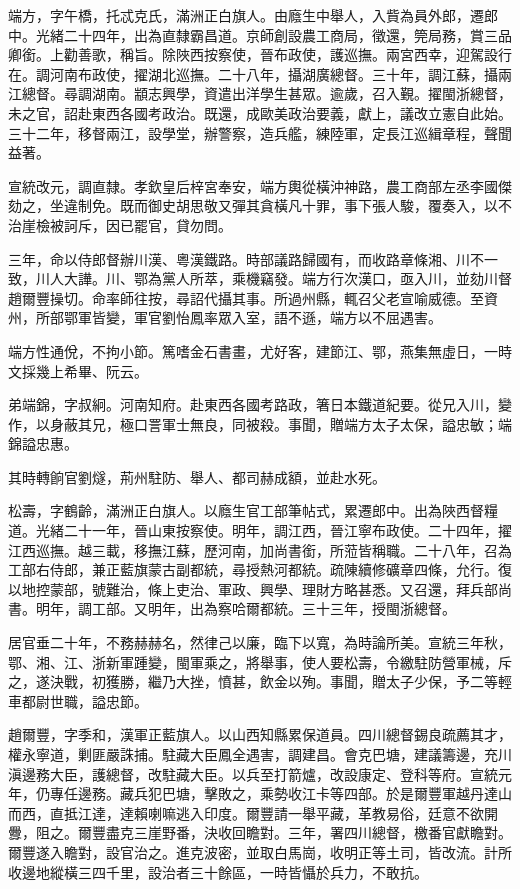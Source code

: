 \begin{pinyinscope}
端方，字午橋，托忒克氏，滿洲正白旗人。由廕生中舉人，入貲為員外郎，遷郎中。光緒二十四年，出為直隸霸昌道。京師創設農工商局，徵還，筦局務，賞三品卿銜。上勸善歌，稱旨。除陜西按察使，晉布政使，護巡撫。兩宮西幸，迎駕設行在。調河南布政使，擢湖北巡撫。二十八年，攝湖廣總督。三十年，調江蘇，攝兩江總督。尋調湖南。顓志興學，資遣出洋學生甚眾。逾歲，召入覲。擢閩浙總督，未之官，詔赴東西各國考政治。既還，成歐美政治要義，獻上，議改立憲自此始。三十二年，移督兩江，設學堂，辦警察，造兵艦，練陸軍，定長江巡緝章程，聲聞益著。

宣統改元，調直隸。孝欽皇后梓宮奉安，端方輿從橫沖神路，農工商部左丞李國傑劾之，坐違制免。既而御史胡思敬又彈其貪橫凡十罪，事下張人駿，覆奏入，以不治崖檢被訶斥，因已罷官，貸勿問。

三年，命以侍郎督辦川漢、粵漢鐵路。時部議路歸國有，而收路章條湘、川不一致，川人大譁。川、鄂為黨人所萃，乘機竊發。端方行次漢口，亟入川，並劾川督趙爾豐操切。命率師往按，尋詔代攝其事。所過州縣，輒召父老宣喻威德。至資州，所部鄂軍皆變，軍官劉怡鳳率眾入室，語不遜，端方以不屈遇害。

端方性通侻，不拘小節。篤嗜金石書畫，尤好客，建節江、鄂，燕集無虛日，一時文採幾上希畢、阮云。

弟端錦，字叔絅。河南知府。赴東西各國考路政，箸日本鐵道紀要。從兄入川，變作，以身蔽其兄，極口詈軍士無良，同被殺。事聞，贈端方太子太保，謚忠敏；端錦謚忠惠。

其時轉餉官劉燧，荊州駐防、舉人、都司赫成額，並赴水死。

松壽，字鶴齡，滿洲正白旗人。以廕生官工部筆帖式，累遷郎中。出為陜西督糧道。光緒二十一年，晉山東按察使。明年，調江西，晉江寧布政使。二十四年，擢江西巡撫。越三載，移撫江蘇，歷河南，加尚書銜，所蒞皆稱職。二十八年，召為工部右侍郎，兼正藍旗蒙古副都統，尋授熱河都統。疏陳續修礦章四條，允行。復以地控蒙部，號難治，條上吏治、軍政、興學、理財方略甚悉。又召還，拜兵部尚書。明年，調工部。又明年，出為察哈爾都統。三十三年，授閩浙總督。

居官垂二十年，不務赫赫名，然律己以廉，臨下以寬，為時論所美。宣統三年秋，鄂、湘、江、浙新軍踵變，閩軍乘之，將舉事，使人要松壽，令繳駐防營軍械，斥之，遂決戰，初獲勝，繼乃大挫，憤甚，飲金以殉。事聞，贈太子少保，予二等輕車都尉世職，謚忠節。

趙爾豐，字季和，漢軍正藍旗人。以山西知縣累保道員。四川總督錫良疏薦其才，權永寧道，剿匪嚴誅捕。駐藏大臣鳳全遇害，調建昌。會克巴塘，建議籌邊，充川滇邊務大臣，護總督，改駐藏大臣。以兵至打箭爐，改設康定、登科等府。宣統元年，仍專任邊務。藏兵犯巴塘，擊敗之，乘勢收江卡等四部。於是爾豐軍越丹達山而西，直抵江達，達賴喇嘛逃入印度。爾豐請一舉平藏，革教易俗，廷意不欲開釁，阻之。爾豐盡克三崖野番，決收回瞻對。三年，署四川總督，檄番官獻瞻對。爾豐遂入瞻對，設官治之。進克波密，並取白馬崗，收明正等土司，皆改流。計所收邊地縱橫三四千里，設治者三十餘區，一時皆懾於兵力，不敢抗。


\end{pinyinscope}
